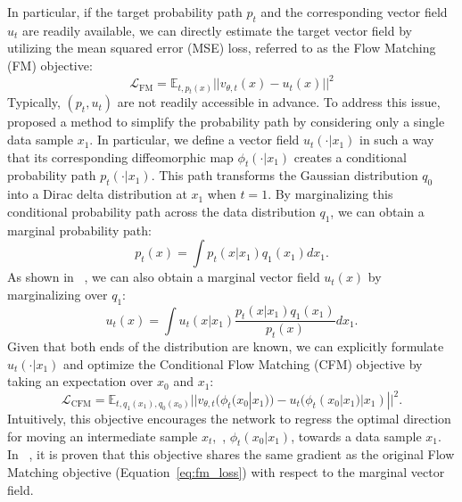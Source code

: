 \iffalse
In particular, if the target probability path $p_t$ and the corresponding vector field $u_t$ are readily available, we can directly estimate the target vector field by utilizing the mean squared error (MSE) loss, referred to as the Flow Matching (FM) objective:
\begin{equation}
\label{eq:fm_loss}
\mathcal{L}_{\text{FM}} = \mathbb{E}_{t,p_t(x)}||v_{\theta, t}(x) - u_t(x)||^2
\end{equation}
 
Typically, $(p_t, u_t)$ are not readily accessible in advance. To address this issue,~\cite{lipman2022flow} proposed a method to simplify the probability path by considering only a single data sample $x_1$.
%
In particular, we define a vector field $u_t(\cdot |x_1)$ in such a way that its corresponding diffeomorphic map $\phi_t(\cdot| x_1)$ creates a conditional probability path $p_t(\cdot|x_1)$. This path transforms the Gaussian distribution $q_0$ into a Dirac delta distribution at $x_1$ when $t=1$.
%
By marginalizing this conditional probability path across the data distribution $q_1$, we can obtain a marginal probability path:
\begin{equation}
p_t(x) = \int p_t(x|x_1) q_1(x_1) dx_1.
\end{equation}
As shown in ~\cite{lipman2022flow}, we can also obtain a marginal vector field $u_t(x)$ by marginalizing over $q_1$:
\begin{equation}
u_t(x) = \int u_t(x|x_1) \frac{p_t(x|x_1) q_1(x_1)}{p_t(x)} dx_1.
\end{equation}
%
Given that both ends of the distribution are known, we can explicitly formulate $u_t(\cdot | x_1)$ and optimize the Conditional Flow Matching (CFM) objective by taking an expectation over $x_0$ and $x_1$:
\begin{equation}
\label{eq:cfm_x0_x1}
\mathcal{L}_{\text{CFM}} = \mathbb{E}_{t,q_1(x_1),q_0(x_0)}||v_{\theta,t}(\phi_t(x_0|x_1)) - u_t(\phi_t(x_0|x_1)|x_1)||^2.
\end{equation}
Intuitively, this objective encourages the network to regress the optimal direction for moving an intermediate sample $x_t$,~\ie, $\phi_t(x_0|x_1)$, towards a data sample $x_1$.
In ~\cite{lipman2022flow}, it is proven that this objective shares the same gradient as the original Flow Matching objective (Equation~\ref{eq:fm_loss}) with respect to the marginal vector field.
